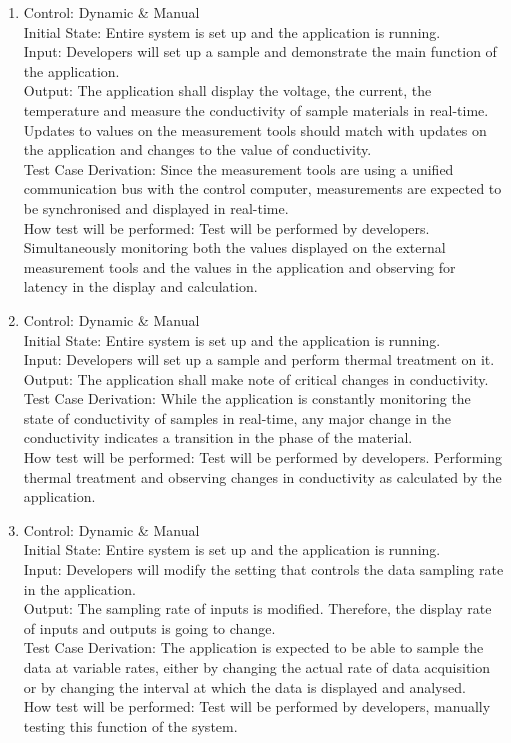 \documentclass[12pt, titlepage]{article}
\begin{document}
\begin{enumerate}[{FR-T}1.]
    \item Control: Dynamic \& Manual \\
    Initial State: Entire system is set up and the application is running.\\
    Input: Developers will set up a sample and demonstrate the main function of the application.\\
    Output: The application shall display the voltage, the current, the temperature and measure the conductivity of sample materials in real-time. Updates to values on the measurement tools should match with updates on the application and changes to the value of conductivity. \\
    Test Case Derivation: Since the measurement tools are using a unified communication bus with the control computer, measurements are expected to be synchronised and displayed in real-time.\\
    How test will be performed: Test will be performed by developers. Simultaneously monitoring both the values displayed on the external measurement tools and the values in the application and observing for latency in the display and calculation.
    
    \item Control: Dynamic \& Manual\\
    Initial State: Entire system is set up and the application is running.\\
    Input: Developers will set up a sample and perform thermal treatment on it.\\
    Output: The application shall make note of critical changes in conductivity.\\
    Test Case Derivation: While the application is constantly monitoring the state of conductivity of samples in real-time, any major change in the conductivity indicates a transition in the phase of the material.\\
    How test will be performed: Test will be performed by developers. Performing thermal treatment and observing changes in conductivity as calculated by the application.
    
    \item Control: Dynamic \& Manual\\
    Initial State: Entire system is set up and the application is running.\\
    Input: Developers will modify the setting that controls the data sampling rate in the application.\\
    Output: The sampling rate of inputs is modified. Therefore, the display rate of inputs and outputs is going to change.\\
    Test Case Derivation: The application is expected to be able to sample the data at variable rates, either by changing the actual rate of data acquisition or by changing the interval at which the data is displayed and analysed.\\
    How test will be performed: Test will be performed by developers, manually testing this function of the system. 
    

\end{enumerate}
\end{document}
